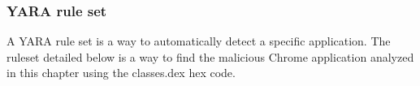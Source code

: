 \newpage
\subsubsection{YARA rule set}

A YARA rule set is a way to automatically detect a specific application.
The ruleset detailed below is a way to find the malicious Chrome application analyzed in this chapter using the classes.dex hex code.



